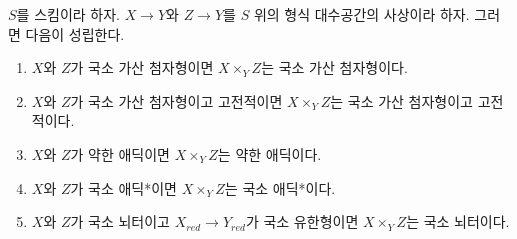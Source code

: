 \begin{lemma}
\label{lemma-types-fibre-products}
$S$를 스킴이라 하자. $X \to Y$와 $Z \to Y$를 $S$ 위의 형식
대수공간의 사상이라 하자. %
그러면 다음이 성립한다.
\begin{enumerate}
\item $X$와 $Z$가 국소 가산 첨자형이면 $X \times_Y Z$는 국소
가산 첨자형이다.
\item $X$와 $Z$가 국소 가산 첨자형이고 고전적이면
$X \times_Y Z$는 국소 가산 첨자형이고 고전적이다.
\item $X$와 $Z$가 약한 애딕이면 $X \times_Y Z$는 약한
애딕이다. %
\item $X$와 $Z$가 국소 애딕*이면 $X \times_Y Z$는 국소 애딕*이다.
\item $X$와 $Z$가 국소 뇌터이고 $X_{red} \to Y_{red}$가 국소
유한형이면 $X \times_Y Z$는 국소 뇌터이다.
\end{enumerate}
\end{lemma}

